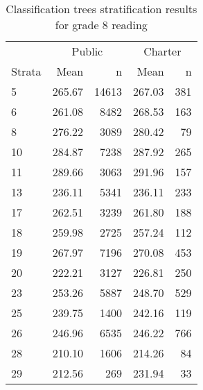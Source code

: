 \begin{table}[ht]
\centering
\caption{Classification trees stratification results for grade 8 reading} 
\label{g8read-circpsa-tree}
\begin{tabular}{lrr@{\extracolsep{.2cm}}rr}
  \hline
   & \multicolumn{2}{c}{Public} & \multicolumn{2}{c}{Charter} \\ \cline{2-3} \cline{4-5} Strata & Mean & n & Mean & n \\ \hline
5 & 265.67 & 14613 & 267.03 & 381 \\ 
  6 & 261.08 & 8482 & 268.53 & 163 \\ 
  8 & 276.22 & 3089 & 280.42 &  79 \\ 
  10 & 284.87 & 7238 & 287.92 & 265 \\ 
  11 & 289.66 & 3063 & 291.96 & 157 \\ 
  13 & 236.11 & 5341 & 236.11 & 233 \\ 
  17 & 262.51 & 3239 & 261.80 & 188 \\ 
  18 & 259.98 & 2725 & 257.24 & 112 \\ 
  19 & 267.97 & 7196 & 270.08 & 453 \\ 
  20 & 222.21 & 3127 & 226.81 & 250 \\ 
  23 & 253.26 & 5887 & 248.70 & 529 \\ 
  25 & 239.75 & 1400 & 242.16 & 119 \\ 
  26 & 246.96 & 6535 & 246.22 & 766 \\ 
  28 & 210.10 & 1606 & 214.26 &  84 \\ 
  29 & 212.56 & 269 & 231.94 &  33 \\ 
   \hline
\end{tabular}
\end{table}

